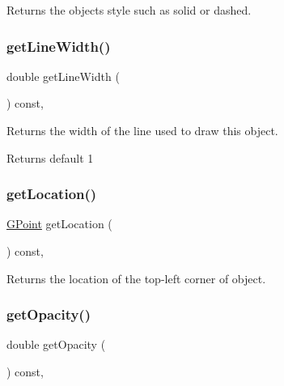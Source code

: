 Returns the object\textquotesingle{}s style such as solid or dashed. 

\mbox{\label{classGObject_a85ff266dc3eb63d9f2d8e5a4487fd3c0}} 
\subsubsection{\texorpdfstring{get\+Line\+Width()}{getLineWidth()}}
{\footnotesize\ttfamily double get\+Line\+Width (\begin{DoxyParamCaption}{ }\end{DoxyParamCaption}) const\hspace{0.3cm}{\ttfamily [virtual]}, {\ttfamily [inherited]}}



Returns the width of the line used to draw this object. 

\begin{DoxyReturn}{Returns}
default 1 
\end{DoxyReturn}
\mbox{\label{classGObject_a4f83802015511edeb63b892830812c11}} 
\subsubsection{\texorpdfstring{get\+Location()}{getLocation()}}
{\footnotesize\ttfamily \mbox{\hyperlink{classGPoint}{G\+Point}} get\+Location (\begin{DoxyParamCaption}{ }\end{DoxyParamCaption}) const\hspace{0.3cm}{\ttfamily [virtual]}, {\ttfamily [inherited]}}



Returns the location of the top-\/left corner of object. 

\mbox{\label{classGObject_a1ae3fc278cc5b71b9f2d96a8a83cdf26}} 
\subsubsection{\texorpdfstring{get\+Opacity()}{getOpacity()}}
{\footnotesize\ttfamily double get\+Opacity (\begin{DoxyParamCaption}{ }\end{DoxyParamCaption}) const\hspace{0.3cm}{\ttfamily [virtual]}, {\ttfamily [inherited]}}



